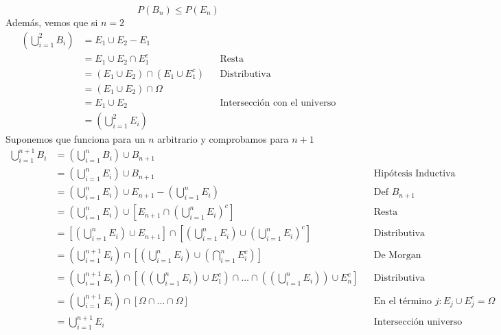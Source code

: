 \begin{enumerate}
\[            \]
            \begin{equation}
                P(B_n)\leq P(E_n)
            \end{equation}
            Además, vemos que si $n=2$
            \begin{align*}
                \left(\bigcup_{i=1}^2 B_i\right)&=E_1\cup E_2-E_1\\
                &=E_1\cup E_2\cap E_1^c&&\text{Resta}\\
                &=(E_1\cup E_2)\cap(E_1\cup E_1^c)&&\text{Distributiva}\\
                &=(E_1\cup E_2)\cap\Omega\\
                &=E_1\cup E_2&&\text{Intersección con el universo}\\
                &=\left(\bigcup_{i=1}^2 E_i\right)
            \end{align*}
            Suponemos que funciona para un $n$ arbitrario y comprobamos para $n+1$
            \begin{align*}
                \bigcup_{i=1}^{n+1} B_i&=\left(\bigcup_{i=1}^{n} B_i\right)\cup B_{n+1}\\
                &=\left(\bigcup_{i=1}^{n} E_i\right)\cup B_{n+1}&&\text{Hipótesis Inductiva}\\
                &=\left(\bigcup_{i=1}^{n} E_i\right)\cup E_{n+1}-\left(\bigcup_{i=1}^{n} E_i\right)&&\text{Def }B_{n+1}\\
                &=\left(\bigcup_{i=1}^{n} E_i\right)\cup \left[E_{n+1}\cap\left(\bigcup_{i=1}^{n} E_i\right)^c\right]&&\text{Resta}\\
                &=\left[\left(\bigcup_{i=1}^{n} E_i\right)\cup E_{n+1}\right]\cap\left[\left(\bigcup_{i=1}^{n} E_i\right)\cup\left(\bigcup_{i=1}^{n} E_i\right)^c\right]&&\text{Distributiva}\\
                &=\left(\bigcup_{i=1}^{n+1} E_i\right)\cap \left[\left(\bigcup_{i=1}^{n} E_i\right)\cup\left(\bigcap_{i=1}^{n} E_i^c\right)\right]&&\text{De Morgan}\\
                &=\left(\bigcup_{i=1}^{n+1} E_i\right)\cap\left[\left(\left(\bigcup_{i=1}^{n} E_i\right)\cup E_1^c\right)\cap\dots\cap\left(\left(\bigcup_{i=1}^{n} E_i\right)\right)\cup E_n^c\right]&&\text{Distributiva}\\
                &=\left(\bigcup_{i=1}^{n+1} E_i\right)\cap\left[\Omega\cap\dots\cap\Omega\right]&&\text{En el término }j:E_j\cup E_j^c=\Omega\\
                &=\bigcup_{i=1}^{n+1} E_i&&\text{Intersección universo}

\end{align*}
\end{enumerate}
